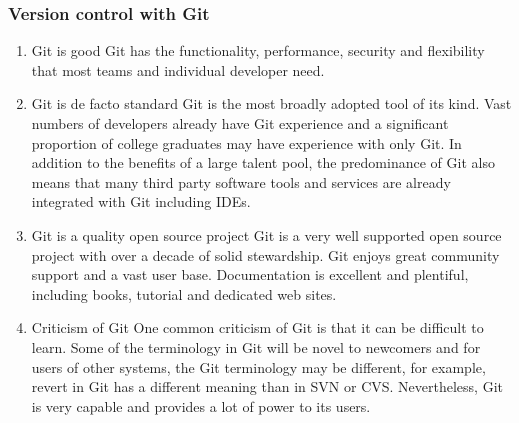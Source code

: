 \documentclass[11pt]{article}
\begin{document}
\subsubsection{Version control with Git}
\label{sec:org3be33bc}
\begin{enumerate}
\item Git is good
\label{sec:org1ab0c9d}
Git has the functionality, performance, security and flexibility that most teams and individual developer need.

\item Git is de facto standard
\label{sec:org7a663aa}
Git is the most broadly adopted tool of its kind. Vast numbers of developers already have Git experience and a significant proportion of college graduates may have experience with only Git. In addition to the benefits of a large talent pool, the predominance of Git also means that many third party software tools and services are already integrated with Git including IDEs.

\item Git is a quality open source project
\label{sec:orgbdfc4af}
Git is a very well supported open source project with over a decade of solid stewardship. Git enjoys great community support and a vast user base. Documentation is excellent and plentiful, including books, tutorial and dedicated web sites.

\item Criticism of Git
\label{sec:org7ce8f21}
One common criticism of Git is that it can be difficult to learn. Some of the terminology in Git will be novel to newcomers and for users of other systems, the Git terminology may be different, for example, revert in Git has a different meaning than in SVN or CVS. Nevertheless, Git is very capable and provides a lot of power to its users.
\end{enumerate}
\end{document}
